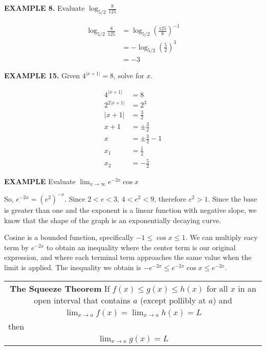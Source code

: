 \documentclass{article}
\begin{document}
{\bf{}EXAMPLE 8.} Evaluate $\displaystyle\log_{5/2}\frac{8}{125}$

\begin{align*}
\log_{5/2}\frac{8}{125}&=\log_{5/2}\left(\frac{125}{8}\right)^{-1}\\
&=-\log_{5/2}\left(\frac{5}{2}\right)^3\\
&=-3
\end{align*}

{\bf{}EXAMPLE 15.} Given $\displaystyle4^{|x+1|}=8$, solve for $x$.

\begin{align*}
4^{|x+1|}&=8\\
2^{2|x+1|}&=2^3\\
|x+1|&=\frac{3}{2}\\
x+1&=\pm\frac{3}{2}\\
x&=\pm\frac{3}{2}-1\\
x_1&=\frac{1}{2}\\
x_2&=-\frac{5}{2}
\end{align*}

{\bf{}EXAMPLE} Evaluate $\displaystyle\lim_{x\to\infty}e^{-2x}\cos x$

\vspace{10pt}

So, $e^{-2x}=(e^2)^{-x}$. Since $2<e<3$, $4<e^2<9$, therefore $e^2>1$. Since the base is greater than one and the exponent is a linear function with negative slope, we know that the shape of the graph is an exponentially decaying curve.

\begin{center}
\end{center}

Cosine is a bounded function, specifically $-1\leq\cos x\leq1$. We can multiply eacy term by $e^{-2x}$ to obtain an inequality where the center term is our original expression, and where each terminal term approaches the same value when the limit is applied. The inequality we obtain is $-e^{-2x}\leq e^{-2x}\cos x\leq e^{-2x}$.

\vspace{10pt}

\begin{tabularx}{\textwidth}{|c|}
\cline{1-1}\\
\multicolumn{1}{|X|}{{\bf{}The Squeeze Theorem} If $f(x)\leq g(x)\leq h(x)$ for all $x$ in an open interval that contains $a$ (except pollibly at $a$) and}\\[2em]
$\displaystyle\lim_{x\to a}f(x)=\lim_{x\to a}h(x)=L$\\[1.5em]
\multicolumn{1}{|l|}{then}\\[1em]
$\displaystyle\lim_{x\to a}g(x)=L$\\[1.5em]
\cline{1-1}
\end{tabularx}
\end{document}
